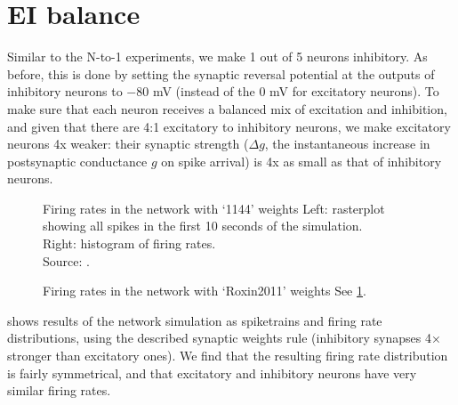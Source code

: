 \section{EI balance}

Similar to the N-to-1 experiments, we make 1 out of 5 neurons inhibitory.
As before, this is done by setting the synaptic reversal potential at the outputs of inhibitory neurons to $-80$ mV (instead of the $0$ mV for excitatory neurons).
To make sure that each neuron receives a balanced mix of excitation and inhibition, and given that there are 4:1 excitatory to inhibitory neurons, we make excitatory neurons 4x weaker: their synaptic strength ($Δg$, the instantaneous increase in postsynaptic conductance $g$ on spike arrival) is 4x as small as that of inhibitory neurons.

\begin{figure}
    \captionn
        {Firing rates in the network with `1144' weights}
        {Left: rasterplot showing all spikes in the first 10 seconds of the simulation.\\
        Right: histogram of firing rates.\\
        Source: .}
    \label{fig:1144-weights}
\end{figure}

\begin{figure}
    \captionn
        {Firing rates in the network with `Roxin2011' weights}
        {See \cref{fig:1144-weights}.}
    \label{fig:roxin-weights}
\end{figure}

 shows results of the network simulation as spiketrains and firing rate distributions, using the described synaptic weights rule (inhibitory synapses 4× stronger than excitatory ones). We find that the resulting firing rate distribution is fairly symmetrical, and that excitatory and inhibitory neurons have very similar firing rates.

